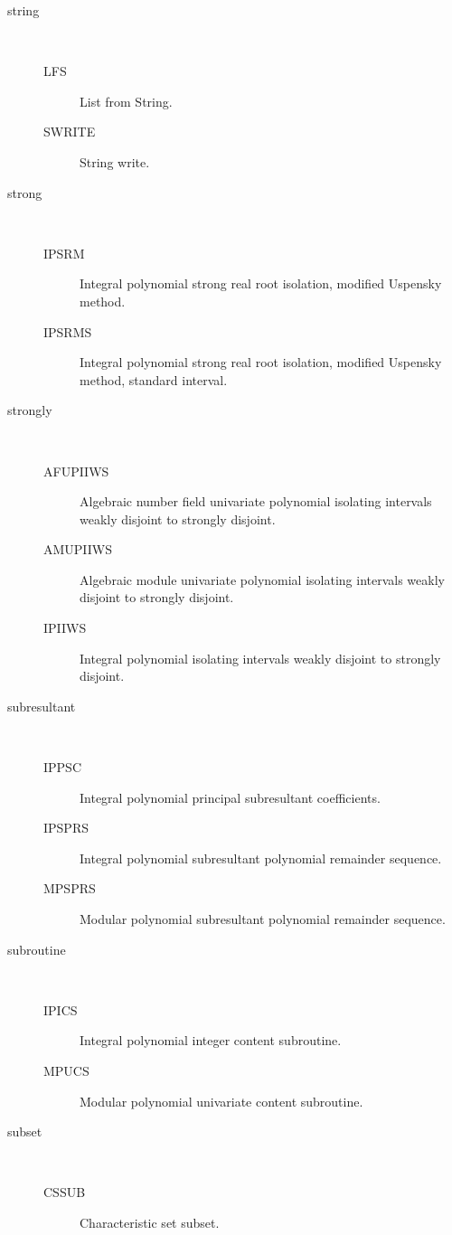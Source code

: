 \begin{description}
\item[string] \ \ 
  \begin{description}
  \item[LFS]  List from String.
  \item[SWRITE]  String write.
  \end{description}
\item[strong] \ \ 
  \begin{description}
  \item[IPSRM]  Integral polynomial strong real root isolation, modified
    Uspensky method.
  \item[IPSRMS]  Integral polynomial strong real root isolation, modified
    Uspensky method, standard interval.
  \end{description}
\item[strongly] \ \ 
  \begin{description}
  \item[AFUPIIWS]  Algebraic number field univariate polynomial isolating
    intervals weakly disjoint to strongly disjoint.
  \item[AMUPIIWS]  Algebraic module univariate polynomial isolating intervals
    weakly disjoint to strongly disjoint.
  \item[IPIIWS]  Integral polynomial isolating intervals weakly disjoint to
    strongly disjoint.
  \end{description}
\item[subresultant] \ \ 
  \begin{description}
  \item[IPPSC]  Integral polynomial principal subresultant coefficients.
  \item[IPSPRS]  Integral polynomial subresultant polynomial remainder
    sequence.
  \item[MPSPRS]  Modular polynomial subresultant polynomial remainder
    sequence.
  \end{description}
\item[subroutine] \ \ 
  \begin{description}
  \item[IPICS]  Integral polynomial integer content subroutine.
  \item[MPUCS]  Modular polynomial univariate content subroutine.
  \end{description}
\item[subset] \ \ 
  \begin{description}
  \item[CSSUB]  Characteristic set subset.
  \end{description}

\end{description}
